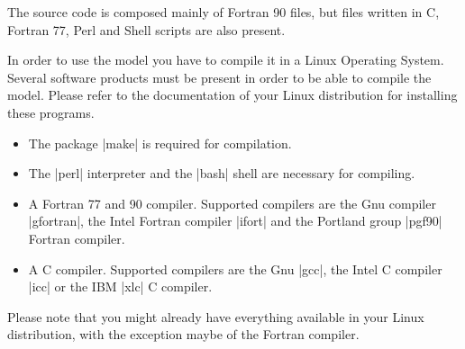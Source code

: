 
%
%
%
%
%
%
%

The source code is composed mainly of Fortran 90 files, but files written
in C, Fortran 77, Perl and Shell scripts are also present.

In order to use the model you have to compile it in a Linux Operating
System. Several software products must be present in order to be able
to compile the model. Please refer to the documentation of your Linux
distribution for installing these programs.

\begin{itemize}

\item The package |make| is required for compilation.

\item The |perl| interpreter and the |bash| shell are necessary for compiling.

\item A Fortran 77 and 90 compiler. Supported compilers are the Gnu 
compiler |gfortran|, the Intel Fortran compiler |ifort| and the Portland 
group |pgf90| Fortran compiler.

\item A C compiler. Supported compilers are the Gnu |gcc|, the Intel C
compiler |icc| or the IBM |xlc| C compiler.

\end{itemize}

Please note that you might already have everything available in your
Linux distribution, with the exception maybe of the Fortran compiler.

